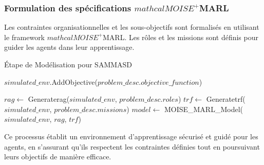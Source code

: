\documentclass[sigconf,anonymous]{aamas}
\begin{document}
\subsubsection{Formulation des spécifications $mathcal{M}OISE^+$MARL}

Les contraintes organisationnelles et les sous-objectifs sont formalisés en utilisant le framework $mathcal{M}OISE^+$MARL. Les rôles et les missions sont définis pour guider les agents dans leur apprentissage.





\begin{algorithm}[hbt!]
  \caption{Étape de Modélisation pour SAMMASD}\label{alg:modeling}

  \SetAlgoLined
{}


$simulated\_env$.AddObjective($problem\_desc.objective\_function$)\;

$rag \gets$ Generaterag($simulated\_env$, $problem\_desc.roles$)\;
$trf \gets$ Generatetrf($simulated\_env$, $problem\_desc.missions$)\;
$model \gets$ MOISE\_MARL\_Model($simulated\_env$, $rag$, $trf$)\;


\end{algorithm}


Ce processus établit un environnement d'apprentissage sécurisé et guidé pour les agents, en s'assurant qu'ils respectent les contraintes définies tout en poursuivant leurs objectifs de manière efficace.
\end{document}
